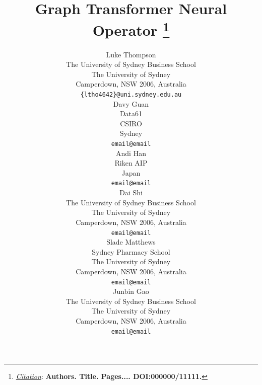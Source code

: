 \documentclass{article}
\title{Graph Transformer Neural Operator
\thanks{\textit{\underline{Citation}}: 
\textbf{Authors. Title. Pages.... DOI:000000/11111.}} 
}
\author{
  Luke Thompson \\
  The University of Sydney Business School \\
  The University of Sydney \\
  Camperdown, NSW 2006, Australia\\
  \texttt{\{ltho4642\}@uni.sydney.edu.au} \\
  \And
  Davy Guan \\
  Data61 \\
  CSIRO \\
  Sydney\\
  \texttt{email@email} \\
  \And
  Andi Han \\
  Riken AIP \\
  Japan\\
  \texttt{email@email} \\
  \And
  Dai Shi \\
The University of Sydney Business School \\
  The University of Sydney \\
   Camperdown, NSW 2006, Australia\\
  \texttt{email@email} \\
  \And
  Slade Matthews \\
  Sydney Pharmacy School \\
  The University of Sydney \\
  Camperdown, NSW 2006, Australia\\
  \texttt{email@email} \\  
  \And
  Junbin Gao \\
  The University of Sydney Business School \\
  The University of Sydney \\
   Camperdown, NSW 2006, Australia\\
  \texttt{email@email} \\
}
\begin{document}
\maketitle



\printbibliography
\printglossaries
\end{document}
